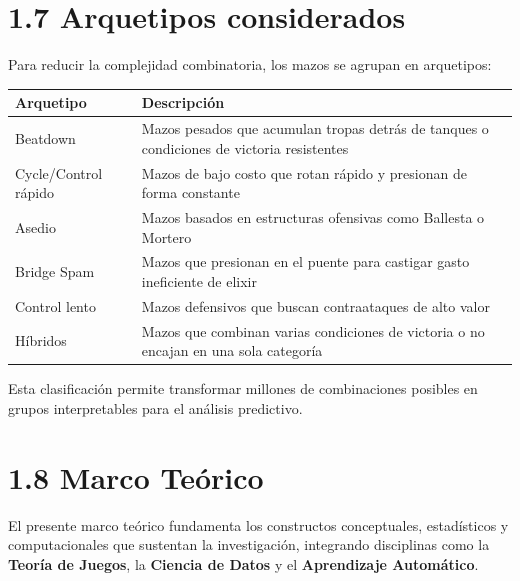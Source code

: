 \documentclass[
  spanish,
  12pt,
]{report}
\newcounter{none} %
\begin{document}
\section{1.7 Arquetipos considerados}\label{arquetipos-considerados}

Para reducir la complejidad combinatoria, los mazos se agrupan en
arquetipos:

{\def\LTcaptype{none} %
\begin{longtable}[]{@{}
  >{\raggedright\arraybackslash}p{}
  >{\raggedright\arraybackslash}p{}@{}}
\toprule\noalign{}
\begin{minipage}[b]{\linewidth}\raggedright
Arquetipo
\end{minipage} & \begin{minipage}[b]{\linewidth}\raggedright
Descripción
\end{minipage} \\
\midrule\noalign{}
\endhead
\bottomrule\noalign{}
\endlastfoot
Beatdown & Mazos pesados que acumulan tropas detrás de tanques o
condiciones de victoria resistentes \\
Cycle/Control rápido & Mazos de bajo costo que rotan rápido y presionan
de forma constante \\
Asedio & Mazos basados en estructuras ofensivas como Ballesta o
Mortero \\
Bridge Spam & Mazos que presionan en el puente para castigar gasto
ineficiente de elixir \\
Control lento & Mazos defensivos que buscan contraataques de alto
valor \\
Híbridos & Mazos que combinan varias condiciones de victoria o no
encajan en una sola categoría \\
\end{longtable}
}

Esta clasificación permite transformar millones de combinaciones
posibles en grupos interpretables para el análisis predictivo.

\section{1.8 Marco Teórico}\label{marco-teuxf3rico}

El presente marco teórico fundamenta los constructos conceptuales,
estadísticos y computacionales que sustentan la investigación,
integrando disciplinas como la \textbf{Teoría de Juegos}, la
\textbf{Ciencia de Datos} y el \textbf{Aprendizaje Automático}.
\end{document}
